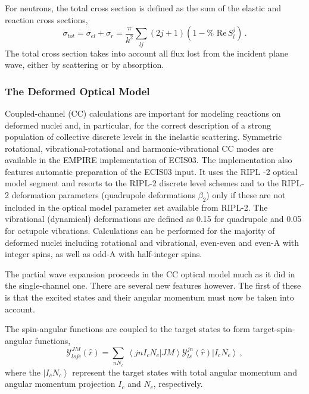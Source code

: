 For neutrons, the total cross section is defined as the sum of the elastic
and reaction cross sections,
\begin{equation}
\sigma_{tot}=\sigma_{el}+\sigma_{r}=\frac{\pi}{k^{2}}\sum_{lj}(2j+1)(1-\text{%
Re}\, S_{l}^{j})\,.
\end{equation}
The total cross section takes into account all flux lost from the incident
plane wave, either by scattering or by absorption.

\subsubsection{The Deformed Optical Model\label{sec:DWBA-CC}}

Coupled-channel (CC) calculations are important for modeling reactions on
deformed nuclei and, in particular, for the correct description of a strong
population of collective discrete levels in the inelastic scattering.
Symmetric rotational, vibrational-rotational and harmonic-vibrational CC
modes are available in the EMPIRE implementation of ECIS03. The
implementation also features automatic preparation of the ECIS03 input. It
uses the RIPL%
-2 \cite{RIPL2} optical model segment and resorts to the RIPL-2
discrete level schemes and to the RIPL-2 deformation parameters (quadrupole
deformations $\beta _{2}$) only if these are not included in the optical
model parameter set available from RIPL-2. The vibrational (dynamical)
deformations are defined as 0.15 for quadrupole and 0.05 for octupole
vibrations. Calculations can be performed for the majority of deformed
nuclei including rotational and vibrational, even-even and even-A with
integer spins, as well as odd-A with half-integer spins.

The partial wave expansion proceeds in the CC optical model much as it did
in the single-channel one. There are several new features however. The first
of these is that the excited states and their angular momentum must now be
taken into account.

The spin-angular functions are coupled to the target states to form
target-spin-angular functions,
\begin{equation}
{\mathcal{Y}}_{lsjc}^{JM}(%
\hat{r})=\sum_{nN_{c}}\,\left\langle jnI_{c}N_{c}|JM\right\rangle {\mathcal{Y%
}}_{ls}^{jn}(\hat{r})\left|I_{c}N_{c}\right\rangle \,,
\end{equation}
where the $\left|I_{c}N_{c}\right\rangle $ represent the target states with
total angular momentum and angular momentum projection $I_{c}$ and $N_{c}$,
respectively.

